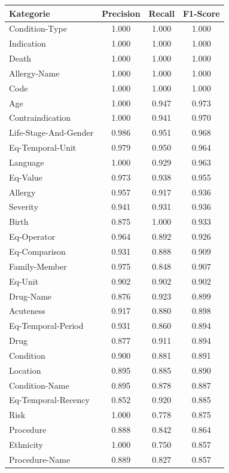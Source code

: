 \begin{table}[htbp]
\centering
\begin{tabular}{p{5cm}ccc}
\toprule
\textbf{Kategorie} & \textbf{Precision} & \textbf{Recall} & \textbf{F1-Score} \\
\midrule
Condition-Type & 1.000 & 1.000 & 1.000 \\
Indication & 1.000 & 1.000 & 1.000 \\
Death & 1.000 & 1.000 & 1.000 \\
Allergy-Name & 1.000 & 1.000 & 1.000 \\
Code & 1.000 & 1.000 & 1.000 \\
Age & 1.000 & 0.947 & 0.973 \\
Contraindication & 1.000 & 0.941 & 0.970 \\
Life-Stage-And-Gender & 0.986 & 0.951 & 0.968 \\
Eq-Temporal-Unit & 0.979 & 0.950 & 0.964 \\
Language & 1.000 & 0.929 & 0.963 \\
Eq-Value & 0.973 & 0.938 & 0.955 \\
Allergy & 0.957 & 0.917 & 0.936 \\
Severity & 0.941 & 0.931 & 0.936 \\
Birth & 0.875 & 1.000 & 0.933 \\
Eq-Operator & 0.964 & 0.892 & 0.926 \\
Eq-Comparison & 0.931 & 0.888 & 0.909 \\
Family-Member & 0.975 & 0.848 & 0.907 \\
Eq-Unit & 0.902 & 0.902 & 0.902 \\
Drug-Name & 0.876 & 0.923 & 0.899 \\
Acuteness & 0.917 & 0.880 & 0.898 \\
Eq-Temporal-Period & 0.931 & 0.860 & 0.894 \\
Drug & 0.877 & 0.911 & 0.894 \\
Condition & 0.900 & 0.881 & 0.891 \\
Location & 0.895 & 0.885 & 0.890 \\
Condition-Name & 0.895 & 0.878 & 0.887 \\
Eq-Temporal-Recency & 0.852 & 0.920 & 0.885 \\
Risk & 1.000 & 0.778 & 0.875 \\
Procedure & 0.888 & 0.842 & 0.864 \\
Ethnicity & 1.000 & 0.750 & 0.857 \\
Procedure-Name & 0.889 & 0.827 & 0.857 \\

\end{tabular}
\end{table}
